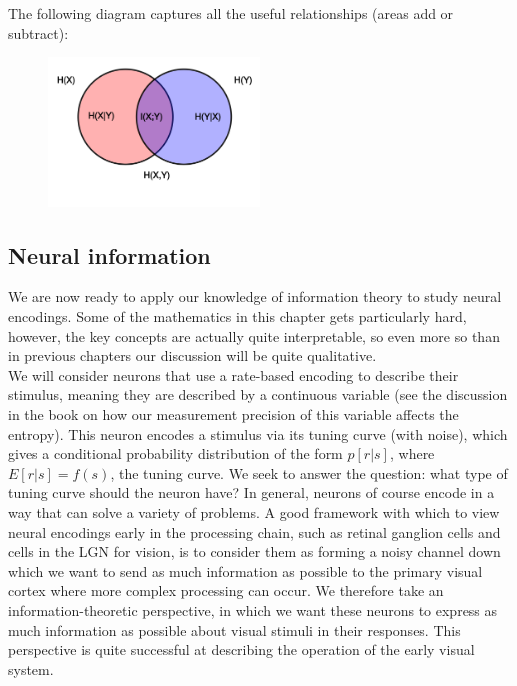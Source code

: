 \documentclass{article}
\begin{document}
The following diagram captures all the useful relationships (areas add or subtract):

\begin{figure}[h] %
    \centering %
    \includegraphics[width=0.5\textwidth]{entropy.png} %
\end{figure}

\subsection{Neural information}

We are now ready to apply our knowledge of information theory to study neural encodings. Some of the mathematics in this chapter gets particularly hard, however, the key concepts are actually quite interpretable, so even more so than in previous chapters our discussion will be quite qualitative.\\

We will consider neurons that use a rate-based encoding to describe their stimulus, meaning they are described by a continuous variable (see the discussion in the book on how our measurement precision of this variable affects the entropy). This neuron encodes a stimulus via its tuning curve (with noise), which gives a conditional probability distribution of the form $p[r|s]$, where $E[r|s]=f(s)$, the tuning curve. We seek to answer the question: what type of tuning curve should the neuron have? In general, neurons of course encode in a way that can solve a variety of problems. A good framework with which to view neural encodings early in the processing chain, such as retinal ganglion cells and cells in the LGN for vision, is to consider them as forming a noisy channel down which we want to send as much information as possible to the primary visual cortex where more complex processing can occur. We therefore take an information-theoretic perspective, in which we want these neurons to express as much information as possible about visual stimuli in their responses. This perspective is quite successful at describing the operation of the early visual system.\\
\end{document}
